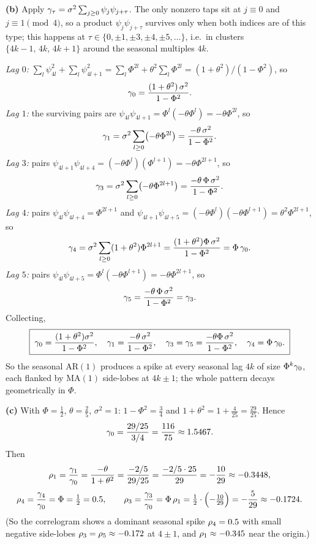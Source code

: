 \documentclass[11pt]{article}
\begin{document}
\textbf{(b)} Apply $\gamma_\tau=\sigma^{2}\sum_{j\ge0}\psi_j\psi_{j+\tau}$. The only nonzero taps sit at $j\equiv0$ and $j\equiv1\pmod4$, so a product $\psi_j\psi_{j+\tau}$ survives only when both indices are of this type; this happens at $\tau\in\{0,\pm1,\pm3,\pm4,\pm5,\dots\}$, i.e.\ in clusters $\{4k-1,\,4k,\,4k+1\}$ around the seasonal multiples $4k$.

\emph{Lag $0$:} $\sum_l\psi_{4l}^{2}+\sum_l\psi_{4l+1}^{2}=\sum_l\Phi^{2l}+\theta^{2}\sum_l\Phi^{2l}=(1+\theta^{2})/(1-\Phi^{2})$, so
\[
\gamma_0=\frac{(1+\theta^{2})\,\sigma^{2}}{1-\Phi^{2}} .
\]
\emph{Lag $1$:} the surviving pairs are $\psi_{4l}\psi_{4l+1}=\Phi^{l}(-\theta\Phi^{l})=-\theta\Phi^{2l}$, so
\[
\gamma_1=\sigma^{2}\sum_{l\ge0}\bigl(-\theta\Phi^{2l}\bigr)=\frac{-\theta\,\sigma^{2}}{1-\Phi^{2}} .
\]
\emph{Lag $3$:} pairs $\psi_{4l+1}\psi_{4l+4}=(-\theta\Phi^{l})(\Phi^{l+1})=-\theta\Phi^{2l+1}$, so
\[
\gamma_3=\sigma^{2}\sum_{l\ge0}\bigl(-\theta\Phi^{2l+1}\bigr)=\frac{-\theta\,\Phi\,\sigma^{2}}{1-\Phi^{2}} .
\]
\emph{Lag $4$:} pairs $\psi_{4l}\psi_{4l+4}=\Phi^{2l+1}$ and $\psi_{4l+1}\psi_{4l+5}=(-\theta\Phi^{l})(-\theta\Phi^{l+1})=\theta^{2}\Phi^{2l+1}$, so
\[
\gamma_4=\sigma^{2}\sum_{l\ge0}(1+\theta^{2})\Phi^{2l+1}=\frac{(1+\theta^{2})\Phi\,\sigma^{2}}{1-\Phi^{2}}=\Phi\,\gamma_0 .
\]
\emph{Lag $5$:} pairs $\psi_{4l}\psi_{4l+5}=\Phi^{l}(-\theta\Phi^{l+1})=-\theta\Phi^{2l+1}$, so
\[
\gamma_5=\frac{-\theta\,\Phi\,\sigma^{2}}{1-\Phi^{2}}=\gamma_3 .
\]
Collecting,
\[
\boxed{\;
\gamma_0=\frac{(1+\theta^{2})\sigma^{2}}{1-\Phi^{2}},\quad
\gamma_1=\frac{-\theta\,\sigma^{2}}{1-\Phi^{2}},\quad
\gamma_3=\gamma_5=\frac{-\theta\Phi\,\sigma^{2}}{1-\Phi^{2}},\quad
\gamma_4=\Phi\,\gamma_0 .
\;}
\]
So the seasonal $\mathrm{AR}(1)$ produces a spike at every seasonal lag $4k$ of size $\Phi^{k}\gamma_0$, each flanked by $\mathrm{MA}(1)$ side-lobes at $4k\pm1$; the whole pattern decays geometrically in $\Phi$.

\textbf{(c)} With $\Phi=\tfrac12$, $\theta=\tfrac25$, $\sigma^{2}=1$: $1-\Phi^{2}=\tfrac34$ and $1+\theta^{2}=1+\tfrac{4}{25}=\tfrac{29}{25}$. Hence
\[
\gamma_0=\frac{29/25}{3/4}=\frac{116}{75}\approx1.5467 .
\]
Then
\[
\rho_1=\frac{\gamma_1}{\gamma_0}=\frac{-\theta}{1+\theta^{2}}=\frac{-2/5}{29/25}=\frac{-2/5\cdot25}{29}=-\frac{10}{29}\approx-0.3448 ,
\]
\[
\rho_4=\frac{\gamma_4}{\gamma_0}=\Phi=\tfrac12=0.5 ,
\qquad
\rho_3=\frac{\gamma_3}{\gamma_0}=\Phi\,\rho_1=\tfrac12\cdot\Bigl(-\tfrac{10}{29}\Bigr)=-\frac{5}{29}\approx-0.1724 .
\]
(So the correlogram shows a dominant seasonal spike $\rho_4=0.5$ with small negative side-lobes $\rho_3=\rho_5\approx-0.172$ at $4\pm1$, and $\rho_1\approx-0.345$ near the origin.)
\end{document}
